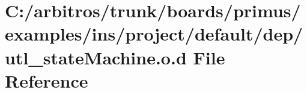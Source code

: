 \hypertarget{ins_2project_2default_2dep_2utl__state_machine_8o_8d}{\section{C\-:/arbitros/trunk/boards/primus/examples/ins/project/default/dep/utl\-\_\-state\-Machine.o.\-d File Reference}
\label{ins_2project_2default_2dep_2utl__state_machine_8o_8d}
}
